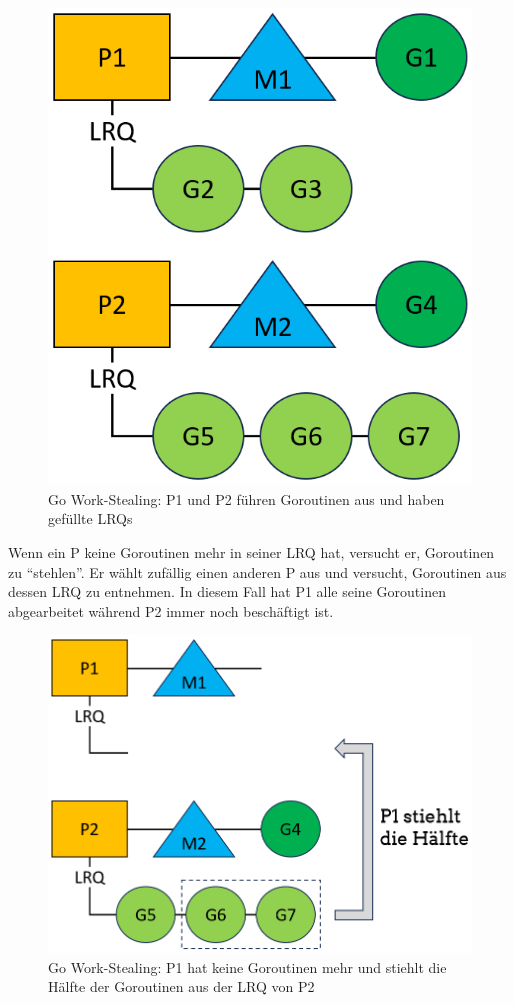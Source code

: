\documentclass[fontsize=12pt,paper=a4,twoside=semi,parskip=half-,headsepline,headinclude]{scrreprt}
\begin{document}
\begin{figure}[H]
	\centering
	\includegraphics[scale=0.5]{figures/GoroutineWorkstealing1.png}
	\caption{Go Work-Stealing: P1 und P2 führen Goroutinen aus und haben gefüllte LRQs}
	\label{fig:GoroutineWorkstealing1}
\end{figure}

Wenn ein P keine Goroutinen mehr in seiner LRQ hat, versucht er, Goroutinen zu ``stehlen''. Er wählt zufällig einen anderen P aus und versucht, Goroutinen aus dessen LRQ zu entnehmen. In diesem Fall hat P1 alle seine Goroutinen abgearbeitet während P2 immer noch beschäftigt ist.

\begin{figure}[H]
	\centering
	\includegraphics[scale=0.5]{figures/GoroutineWorkstealing2.png}
	\caption{Go Work-Stealing: P1 hat keine Goroutinen mehr und stiehlt die Hälfte der Goroutinen aus der LRQ von P2}
	\label{fig:GoroutineWorkstealing2}
\end{figure}
\end{document}
